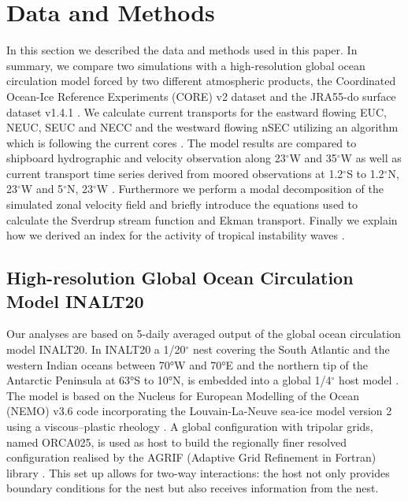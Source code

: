 \documentclass[os, manuscript]{copernicus}
\begin{document}
\section{Data and Methods}
In this section we described the data and methods used in this paper. In summary, we compare two simulations with a high-resolution global ocean circulation model forced by two different atmospheric products, the Coordinated Ocean-Ice Reference Experiments (CORE) v2 dataset \citep{Griffies2009} and the JRA55-do surface dataset v1.4.1 \citep{Tsujino2018}. We calculate current transports for the eastward flowing EUC, NEUC, SEUC and NECC and the westward flowing nSEC utilizing an algorithm which is following the current cores \citep{Hsin2012,Burmeister2019}. The model results are compared to shipboard hydrographic and velocity observation along 23$^{\circ}$W \citep[e.g.][]{Brandt2015,Hahn2017,Burmeister2020} and 35$^{\circ}$W \citep{Hormann2007,Tuchen2022} as well as current transport time series derived from moored observations at 1.2$^{\circ}$S to 1.2$^{\circ}$N, 23$^{\circ}$W \citep{Brandt2021a} and 5$^{\circ}$N, 23$^{\circ}$W \citep{Burmeister2020}. Furthermore we perform a modal decomposition of the simulated zonal velocity field and briefly introduce the equations used to calculate the Sverdrup stream function and Ekman transport. Finally we explain how we derived an index for the activity of tropical instability waves \citep{Lee2014, Olivier2020, Perez2012,Tuchen2022a}.

\subsection{High-resolution Global Ocean Circulation Model INALT20}
Our analyses are based on 5-daily averaged output of the global ocean circulation model INALT20. In INALT20 a 1/20$^{\circ}$ nest covering the South Atlantic and the western Indian oceans
between 70°W and 70°E and the northern tip of the Antarctic Peninsula at 63°S to 10°N, is embedded into a global 1/4$^{\circ}$ host model \citep{Schwarzkopf2019}. The model is based on the Nucleus for European Modelling of the Ocean (NEMO) v3.6 code \citep{Madec2016} incorporating the Louvain-La-Neuve sea-ice model version 2 using a viscous–plastic rheology \citep[LIM2-VP;][]{Fichefet1997}. A global configuration with tripolar grids, named ORCA025, is used as host to build the regionally finer resolved configuration realised by the AGRIF (Adaptive Grid Refinement in Fortran) library \citep{Debreu2008}. This set up allows for two-way interactions: the host not only provides boundary conditions for the nest but also receives information from the nest.
\end{document}
